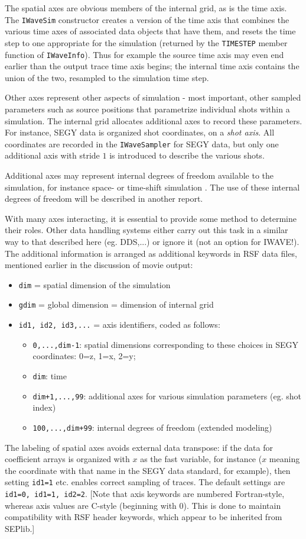 The spatial axes are obvious members of the internal grid, as is the
time axis. The {\tt IWaveSim} constructor creates a version of the
time axis that combines the various time axes of associated data
objects that have them, and resets the time step to one appropriate
for the simulation (returned by the {\tt TIMESTEP} member function of
{\tt IWaveInfo}). Thus for example the source time axis may even
end earlier than the output trace time axis begins; the internal time
axis contains the union of the two, resampled to the simulation time
step.

Other axes represent other aspects of simulation - most important,
other sampled parameters such as source positions that parametrize
individual shots within a simulation. The internal grid allocates
additional axes to record these parameters. For instance, SEGY data is
organized shot coordinates, on a {\em shot axis}. All coordinates are
recorded in the {\tt IWaveSampler} for SEGY data, but only one
additional axis with stride $1$ is introduced to describe the various
shots.

Additional axes may represent internal degrees of freedom available to
the simulation, for instance space- or time-shift simulation \cite[]{geoprosp:2008}. The use of these internal degrees of freedom will be described
in another report.

With many axes interacting, it is essential to provide some method to
determine their roles. Other data handling systems either carry out
this task in a similar way to that described here (eg. DDS,...) or
ignore it (not an option for IWAVE!). The additional information is
arranged as additional keywords in RSF data files, mentioned earlier
in the discussion of movie output:
\begin{itemize}
\item {\tt dim} = spatial dimension of the simulation
\item {\tt gdim} = global dimension = dimension of internal grid
\item {\tt id1, id2, id3,...} = axis identifiers, coded as follows:
\begin{itemize}
\item {\tt 0,...,dim-1}: spatial dimensions corresponding to these
  choices in SEGY coordinates: 0=z, 1=x, 2=y;
\item{\tt dim}: time
\item{\tt dim+1,...,99}: additional axes for various simulation
  parameters (eg. shot index)
\item{\tt 100,...,dim+99}: internal degrees of freedom (extended
  modeling)
\end{itemize}
\end{itemize}
The labeling of spatial axes avoids external data transpose: if the
data for coefficient arrays is organized with $x$ as the fast
variable, for instance ($x$ meaning the coordinate with that name in
the SEGY data standard, for example), then setting {\tt id1=1}
etc. enables correct sampling of traces. The default settings are {\tt
  id1=0, id1=1, id2=2}. [Note that axis keywords are numbered
Fortran-style, whereas axis values are C-style (beginning with
0). This is done to maintain compatibility with RSF header keywords,
which appear to be inherited from SEPlib.]

